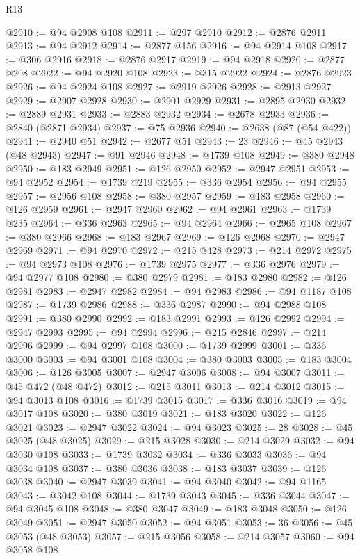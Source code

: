 \begin{lexlean}{R13}
\begin{coremodule}
@2910 := @94 @2908 @108
@2911 := @297 @2910
@2912 := @2876 @2911
@2913 := @94 @2912
@2914 := @2877 @156
@2916 := @94 @2914 @108
@2917 := @306 @2916
@2918 := @2876 @2917
@2919 := @94 @2918
@2920 := @2877 @208
@2922 := @94 @2920 @108
@2923 := @315 @2922
@2924 := @2876 @2923
@2926 := @94 @2924 @108
@2927 := @2919 @2926
@2928 := @2913 @2927
@2929 := @2907 @2928
@2930 := @2901 @2929
@2931 := @2895 @2930
@2932 := @2889 @2931
@2933 := @2883 @2932
@2934 := @2678 @2933
@2936 := @2840 (@2871 @2934)
@2937 := @75 @2936
@2940 := @2638 (@87 (@54 @422))
@2941 := @2940 @51
@2942 := @2677 @51
@2943 := 23
@2946 := @45 @2943 (@48 @2943)
@2947 := @91 @2946
@2948 := @1739 @108
@2949 := @380 @2948
@2950 := @183 @2949
@2951 := @126 @2950
@2952 := @2947 @2951
@2953 := @94 @2952
@2954 := @1739 @219
@2955 := @336 @2954
@2956 := @94 @2955
@2957 := @2956 @108
@2958 := @380 @2957
@2959 := @183 @2958
@2960 := @126 @2959
@2961 := @2947 @2960
@2962 := @94 @2961
@2963 := @1739 @235
@2964 := @336 @2963
@2965 := @94 @2964
@2966 := @2965 @108
@2967 := @380 @2966
@2968 := @183 @2967
@2969 := @126 @2968
@2970 := @2947 @2969
@2971 := @94 @2970
@2972 := @215 @428
@2973 := @214 @2972
@2975 := @94 @2973 @108
@2976 := @1739 @2975
@2977 := @336 @2976
@2979 := @94 @2977 @108
@2980 := @380 @2979
@2981 := @183 @2980
@2982 := @126 @2981
@2983 := @2947 @2982
@2984 := @94 @2983
@2986 := @94 @1187 @108
@2987 := @1739 @2986
@2988 := @336 @2987
@2990 := @94 @2988 @108
@2991 := @380 @2990
@2992 := @183 @2991
@2993 := @126 @2992
@2994 := @2947 @2993
@2995 := @94 @2994
@2996 := @215 @2846
@2997 := @214 @2996
@2999 := @94 @2997 @108
@3000 := @1739 @2999
@3001 := @336 @3000
@3003 := @94 @3001 @108
@3004 := @380 @3003
@3005 := @183 @3004
@3006 := @126 @3005
@3007 := @2947 @3006
@3008 := @94 @3007
@3011 := @45 @472 (@48 @472)
@3012 := @215 @3011
@3013 := @214 @3012
@3015 := @94 @3013 @108
@3016 := @1739 @3015
@3017 := @336 @3016
@3019 := @94 @3017 @108
@3020 := @380 @3019
@3021 := @183 @3020
@3022 := @126 @3021
@3023 := @2947 @3022
@3024 := @94 @3023
@3025 := 28
@3028 := @45 @3025 (@48 @3025)
@3029 := @215 @3028
@3030 := @214 @3029
@3032 := @94 @3030 @108
@3033 := @1739 @3032
@3034 := @336 @3033
@3036 := @94 @3034 @108
@3037 := @380 @3036
@3038 := @183 @3037
@3039 := @126 @3038
@3040 := @2947 @3039
@3041 := @94 @3040
@3042 := @94 @1165
@3043 := @3042 @108
@3044 := @1739 @3043
@3045 := @336 @3044
@3047 := @94 @3045 @108
@3048 := @380 @3047
@3049 := @183 @3048
@3050 := @126 @3049
@3051 := @2947 @3050
@3052 := @94 @3051
@3053 := 36
@3056 := @45 @3053 (@48 @3053)
@3057 := @215 @3056
@3058 := @214 @3057
@3060 := @94 @3058 @108

\end{coremodule}
\end{lexlean}
